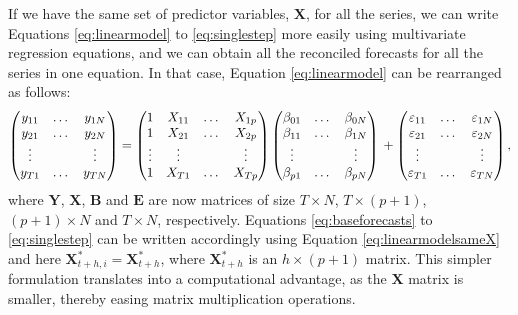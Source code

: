 \documentclass[11pt,a4paper,]{article}
\begin{document}
If we have the same set of predictor variables, \(\bm{X}\), for all the series, we can write Equations \eqref{eq:linearmodel} to \eqref{eq:singlestep} more easily using multivariate regression equations, and we can obtain all the reconciled forecasts for all the series in one equation. In that case, Equation \eqref{eq:linearmodel} can be rearranged as follows:
\begin{equation}\label{eq:linearmodelsameX}
  \begin{pmatrix}
  y_{11} & \dots & y_{1N}\\
  y_{21} & \dots & y_{2N}\\
  \vdots &       & \vdots\\
  y_{T1} & \dots & y_{TN}
  \end{pmatrix} =
  \begin{pmatrix}
  1      & X_{11} & \dots & X_{1p}\\
  1      & X_{21} & \dots & X_{2p}\\
  \vdots & \vdots &       & \vdots\\
  1      & X_{T1} & \dots & X_{Tp}
  \end{pmatrix}
  \begin{pmatrix}
  \beta_{01} & \dots & \beta_{0N}\\
  \beta_{11} & \dots & \beta_{1N}\\
  \vdots     &       & \vdots\\
  \beta_{p1} & \dots & \beta_{pN}
  \end{pmatrix} \\
  +
  \begin{pmatrix}
  \varepsilon_{11} & \dots & \varepsilon_{1N}\\
  \varepsilon_{21} & \dots & \varepsilon_{2N}\\
  \vdots           &       & \vdots\\
  \varepsilon_{T1} & \dots & \varepsilon_{TN}
  \end{pmatrix},
\end{equation}
where \(\bm{Y}\), \(\bm{X}\), \(\bm{B}\) and \(\bm{E}\) are now matrices of size \(T\times N\), \(T\times (p+1)\), \((p+1)\times N\) and \(T \times N\), respectively. Equations \eqref{eq:baseforecasts} to \eqref{eq:singlestep} can be written accordingly using Equation \eqref{eq:linearmodelsameX} and here \(\bm{X}^*_{t+h,i} = \bm{X}^*_{t+h}\), where \(\bm{X}^*_{t+h}\) is an \(h\times (p+1)\) matrix. This simpler formulation translates into a computational advantage, as the \(\bm X\) matrix is smaller, thereby easing matrix multiplication operations.
\end{document}
